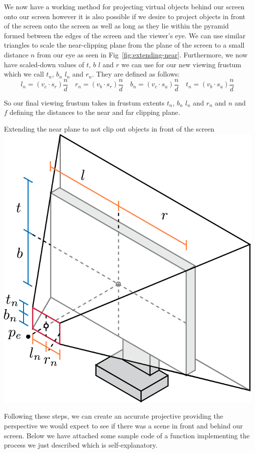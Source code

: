 We now have a working method for projecting virtual objects behind our screen onto our screen however it is also possible if we desire to project objects in front of the screen onto the screen as well as long as they lie within the pyramid formed between the edges of the screen and the viewer's eye. We can use similar triangles to scale the near-clipping plane from the plane of the screen to a small distance $n$ from our eye as seen in Fig~\ref{fig:extending-near}. Furthermore, we now have scaled-down values of $t$, $b$ $l$ and $r$ we can use for our new viewing frustum which we call $t_n$, $b_n$ $l_n$ and $r_n$. They are defined as follows:
\[
    l_n = (v_c \cdot s_r) \frac{n}{d} \quad r_n = (v_b \cdot s_r) \frac{n}{d} \quad b_n = (v_c \cdot s_u) \frac{n}{d} \quad t_n = (v_b \cdot s_u) \frac{n}{d}
\]

So our final viewing frustum takes in frustum extents $t_n$, $b_n$ $l_n$ and $r_n$ and $n$ and $f$ defining the distances to the near and far clipping plane.
\begin{figureBox}[label={fig:extending-near}, width=0.8\linewidth]{Extending the near plane to not clip out objects in front of the screen}
    \centering
    \includegraphics[width = 0.5\linewidth]{./background/figures/projection/extending-near.pdf}
\end{figureBox}

Following these steps, we can create an accurate projective providing the perspective we would expect to see if there was a scene in front and behind our screen. Below we have attached some sample code of a function implementing the process we just described which is self-explanatory.


